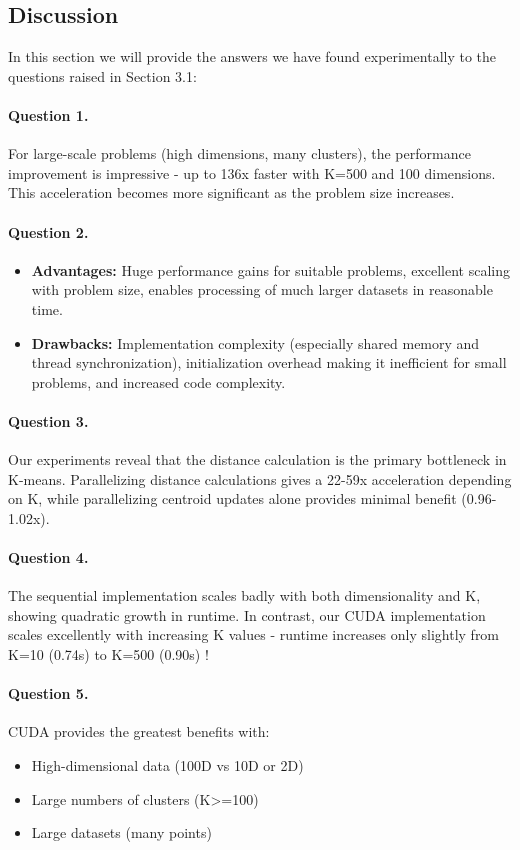 \documentclass[sigconf]{acmart}
\begin{document}
\subsection{Discussion}
In this section we will provide the answers we have found experimentally to the questions raised in Section 3.1:

\paragraph{Question 1.} 
For large-scale problems (high dimensions, many clusters), the performance improvement is impressive - up to 136x faster with K=500 and 100 dimensions. This acceleration becomes more significant as the problem size increases.

\paragraph{Question 2.}
\begin{itemize}
    \item \textbf{Advantages:} Huge performance gains for suitable problems, excellent scaling with problem size, enables processing of much larger datasets in reasonable time.
    \item \textbf{Drawbacks:} Implementation complexity (especially shared memory and thread synchronization), initialization overhead making it inefficient for small problems, and increased code complexity.
\end{itemize}

\paragraph{Question 3.}
Our experiments reveal that the distance calculation is the primary bottleneck in K-means. Parallelizing distance calculations gives a 22-59x acceleration depending on K, while parallelizing centroid updates alone provides minimal benefit (0.96-1.02x). 

\paragraph{Question 4.}
The sequential implementation scales badly with both dimensionality and K, showing quadratic growth in runtime. In contrast, our CUDA implementation scales excellently with increasing K values - runtime increases only slightly from K=10 (0.74s) to K=500 (0.90s) !

\paragraph{Question 5.}
CUDA provides the greatest benefits with:
\begin{itemize}
    \item High-dimensional data (100D vs 10D or 2D)
    \item Large numbers of clusters (K>=100)
    \item Large datasets (many points)
\end{itemize}
\end{document}
